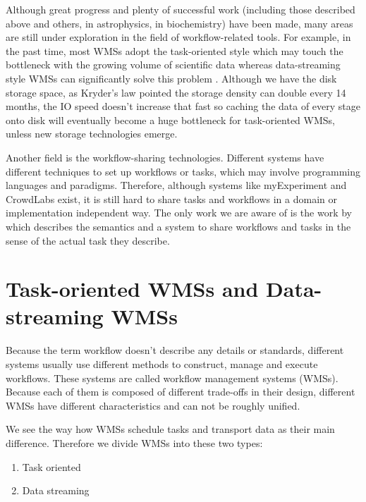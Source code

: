 Although great progress and plenty of successful work (including those described above and others, \eg \cite{berriman2007generating} \cite{berriman2010application} in astrophysics, \cite{aiche2015workflows} in biochemistry) have been made, many areas are still under exploration in the field of workflow-related tools. For example, in the past time, most WMSs adopt the task-oriented style which may touch the bottleneck with the growing volume of scientific data whereas data-streaming style WMSs can significantly solve this problem \cite{doi:10.1177/1094342016649766}. Although we have the disk storage space, as Kryder’s law \citep{Kryders_law} pointed the storage density can double every 14 months, the IO speed doesn't increase that fast so caching the data of every stage onto disk will eventually become a huge bottleneck for task-oriented WMSs, unless new storage technologies emerge.

Another field is the workflow-sharing technologies. Different systems have different techniques to set up workflows or tasks, which may involve programming languages and paradigms. Therefore, although systems like myExperiment \cite{de2008design} and CrowdLabs \cite{Mates2011} exist, it is still hard to share tasks and workflows in a domain or implementation independent way. The only work we are aware of is the work by \citeauthor{GARIJO2017271} \cite{GARIJO2017271} which describes the semantics and a system to share workflows and tasks in the sense of the actual task they describe. 

\section{Task-oriented WMSs and Data-streaming WMSs}
Because the term workflow doesn't describe any details or standards, different systems usually use different methods to construct, manage and execute workflows. These systems are called workflow management systems (WMSs). Because each of them is composed of different trade-offs in their design, different WMSs have different characteristics and can not be roughly unified.

We see the way how WMSs schedule tasks and transport data as their main difference. Therefore we divide WMSs into these two types:
\begin{enumerate}
	\item Task oriented
	\item Data streaming
\end{enumerate}

